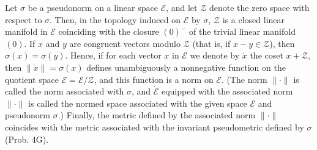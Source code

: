 Let $\sigma$ be a pseudonorm on a linear space $\mathcal{E}$, and let $\mathcal{Z}$ denote the zero space with respect to $\sigma$. Then, in the topology induced on $\mathcal{E}$ by $\sigma$, $\mathcal{Z}$ is a closed linear manifold in $\mathcal{E}$ coinciding with the closure $(0)^-$ of the trivial linear manifold $(0)$. If $x$ and $y$ are congruent vectors modulo $\mathcal{Z}$ (that is, if $x - y \in \mathcal{Z}$), then $\sigma(x) = \sigma(y)$. Hence, if for each vector $x$ in $\mathcal{E}$ we denote by $\dot{x}$ the coset $x + \mathcal{Z}$, then $\|\dot{x}\| = \sigma(x)$ defines unambiguously a nonnegative function on the quotient space $\mathcal{E} = \mathcal{E}/\mathcal{Z}$, and this function is a norm on $\mathcal{E}$. (The norm $\|\cdot\|$ is called the norm associated with $\sigma$, and $\dot{\mathcal{E}}$ equipped with the associated norm $\|\cdot\|$ is called the normed space associated with the given space $\mathcal{E}$ and pseudonorm $\sigma$.) Finally, the metric defined by the associated norm $\|\cdot\|$ coincides with the metric associated with the invariant pseudometric defined by $\sigma$ (Prob. 4G).
